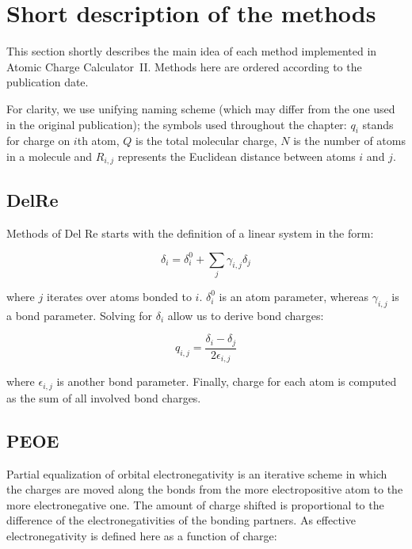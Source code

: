 \documentclass[oneside]{memoir}
\newcommand\ddfrac[2]{\frac{\displaystyle #1}{\displaystyle #2}}
\begin{document}
\chapter*{Short description of the methods}
This section shortly describes the main idea of each method implemented in Atomic Charge Calculator~II. Methods here are ordered according to the publication date.

For clarity, we use unifying naming scheme (which may differ from the one used in the original publication); the symbols used throughout the chapter: $q_i$ stands for charge on $i$th atom, $Q$ is the total molecular charge, $N$ is the number of atoms in a molecule and $R_{i, j}$ represents the Euclidean distance between atoms $i$ and $j$.

\section*{DelRe}
\label{sec:methods_delre}
Methods of Del Re \cite{DelRe1958} starts with the definition of a linear system in the form:

\begin{equation}
\label{eq:delre_main}
\delta_i = \delta_i^0 + \sum_{j}\gamma_{i, j}\delta_j
\end{equation}

where $j$ iterates over atoms bonded to $i$. $\delta_i^0$ is an atom parameter, whereas $\gamma_{i, j}$ is a bond parameter. Solving for $\delta_i$ allow us to derive bond charges:

\begin{equation}
\label{eq:delre_bond}
q_{i, j} = \ddfrac{\delta_i - \delta_j}{2\epsilon_{i, j}}
\end{equation}

where $\epsilon_{i, j}$ is another bond parameter. Finally, charge for each atom is computed as the sum of all involved bond charges. 

\section*{PEOE}
\label{sec:methods_peoe}

Partial equalization of orbital electronegativity \cite{Gasteiger1978, Gasteiger1980} is an iterative scheme in which the charges are moved along the bonds from the more electropositive atom to the more electronegative one. The amount of charge shifted is proportional to the difference of the electronegativities of the bonding partners. As effective electronegativity is defined here as a function of charge:
\end{document}
